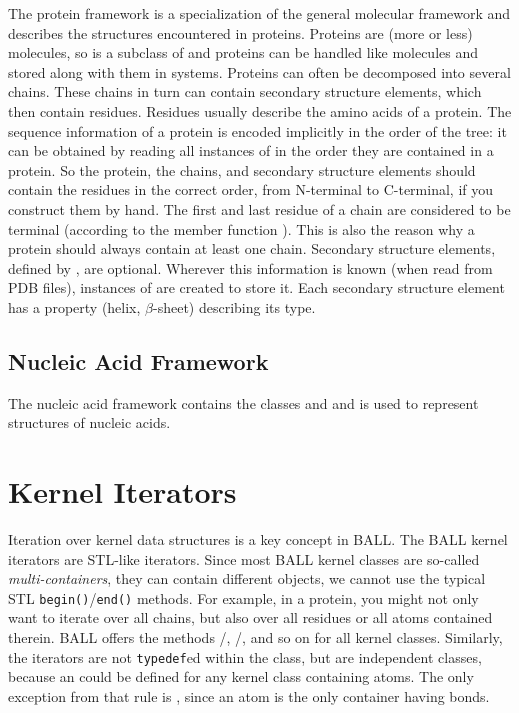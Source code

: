 The protein framework is a specialization of the general molecular
framework and describes the structures encountered in proteins. Proteins are
(more or less) molecules, so  is a subclass of 
and proteins can be handled like molecules and stored along with them in
systems. Proteins can often be decomposed into several chains. These chains in
turn can contain secondary structure elements, which then contain residues.
Residues usually describe the amino acids of a protein. The sequence
information of a protein is encoded implicitly in the order of the tree: it
can be obtained by reading all instances of  in the order they
are contained in a protein. So the protein, the chains, and secondary
structure elements should contain the residues in the correct order, from
N-terminal to C-terminal, if you construct them by hand. The first and last
residue of a chain are considered to be terminal (according to the member
function ). This is also the reason why a protein
should always contain at least one chain. Secondary structure elements,
defined by , are optional. Wherever this information
is known (\eg when read from PDB files), instances of
 are created to store it. Each secondary structure
element has a property (\eg helix, $\beta$-sheet) describing its type.


\subsection{Nucleic Acid Framework}
\label{section:nucleicacidframework}

The nucleic acid framework contains the classes 
and  and is used to represent structures of nucleic acids.


\section{Kernel Iterators}
\label{section:iterators}

Iteration over kernel data structures is a key concept in BALL.
The BALL kernel iterators are STL-like iterators. Since most BALL kernel
classes are so-called {\em multi-containers}, \ie they can contain different
objects, we cannot use the typical STL {\tt begin()}/{\tt end()} methods.
For example, in a protein, you might not only want to iterate over all chains,
but also over all residues or all atoms contained therein. BALL offers
the methods /,
/, and so on for all
kernel classes. Similarly, the iterators are not {\tt typedef}ed within the
class, but are independent classes, because an  could be 
defined for any kernel class containing atoms. The only exception from that rule
is , since an atom is the only container having
bonds.

